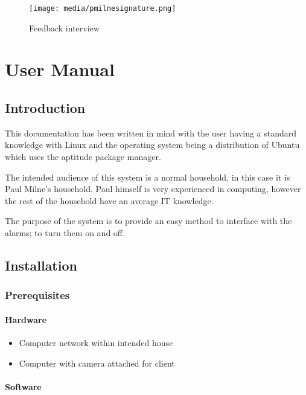 \documentclass[12pt,a4paper]{report}
\begin{document}
		\begin{figure}
			\caption{Feedback interview}
			\label{lst:interview}
			
			\texttt{[image: media/pmilnesignature.png]}
		\end{figure}
		
\newpage
\chapter{User Manual}

\section{Introduction}
    This documentation has been written in mind with the user having a standard knowledge with Linux and the operating system being a
    distribution of Ubuntu which uses the aptitude package manager.

    The intended audience of this system is a normal household, in this case it is Paul Milne's household. Paul himself is very experienced
    in computing, however the rest of the household have an average IT knowledge.

    The purpose of the system is to provide an easy method to interface with the alarms; to turn them on and off. 

\section{Installation}

    \subsection{Prerequisites}

        \subsubsection{Hardware}

            \begin{itemize}
                \item Computer network within intended house
                \item Computer with camera attached for client
            \end{itemize}

        \subsubsection{Software}
\end{document}
